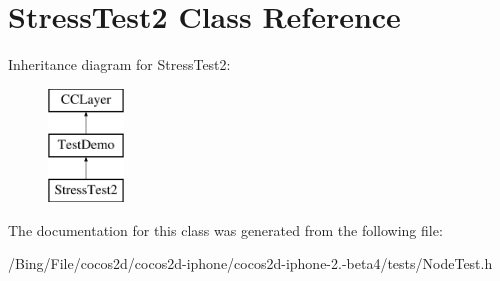 \hypertarget{interface_stress_test2}{\section{Stress\-Test2 Class Reference}
\label{interface_stress_test2}
}
Inheritance diagram for Stress\-Test2\-:\begin{figure}[H]
\begin{center}
\leavevmode
\includegraphics[height=3.000000cm]{interface_stress_test2}
\end{center}
\end{figure}


The documentation for this class was generated from the following file\-:\begin{DoxyCompactItemize}
\item 
/\-Bing/\-File/cocos2d/cocos2d-\/iphone/cocos2d-\/iphone-\/2.-\/beta4/tests/Node\-Test.\-h\end{DoxyCompactItemize}
